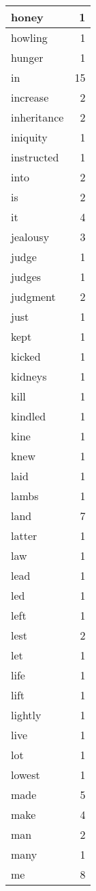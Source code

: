 \begin{center}
\begin{longtable}{l|r}
honey & 1 \\ \hline
howling & 1 \\ \hline
hunger & 1 \\ \hline
in & 15 \\ \hline
increase & 2 \\ \hline
inheritance & 2 \\ \hline
iniquity & 1 \\ \hline
instructed & 1 \\ \hline
into & 2 \\ \hline
is & 2 \\ \hline
it & 4 \\ \hline
jealousy & 3 \\ \hline
judge & 1 \\ \hline
judges & 1 \\ \hline
judgment & 2 \\ \hline
just & 1 \\ \hline
kept & 1 \\ \hline
kicked & 1 \\ \hline
kidneys & 1 \\ \hline
kill & 1 \\ \hline
kindled & 1 \\ \hline
kine & 1 \\ \hline
knew & 1 \\ \hline
laid & 1 \\ \hline
lambs & 1 \\ \hline
land & 7 \\ \hline
latter & 1 \\ \hline
law & 1 \\ \hline
lead & 1 \\ \hline
led & 1 \\ \hline
left & 1 \\ \hline
lest & 2 \\ \hline
let & 1 \\ \hline
life & 1 \\ \hline
lift & 1 \\ \hline
lightly & 1 \\ \hline
live & 1 \\ \hline
lot & 1 \\ \hline
lowest & 1 \\ \hline
made & 5 \\ \hline
make & 4 \\ \hline
man & 2 \\ \hline
many & 1 \\ \hline
me & 8 \\ \hline

\end{longtable}
\end{center}
